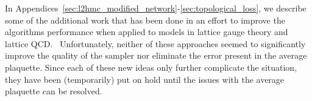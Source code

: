 \clearpage
\begin{appendices}
In Appendices~\ref{sec:l2hmc_modified_network}-\ref{sec:topological_loss}, we
describe some of the additional work that has been done in an effort to
improve the algorithms performance when applied to models in lattice gauge
theory and lattice QCD.\
%
Unfortunately, neither of these approaches seemed to significantly improve
the quality of the sampler nor eliminate the error present in the average
plaquette. 
%
Since each of these new ideas only further complicate the situation, they
have been (temporarily) put on hold until the issues with the average
plaquette can be resolved.

\end{appendices}
